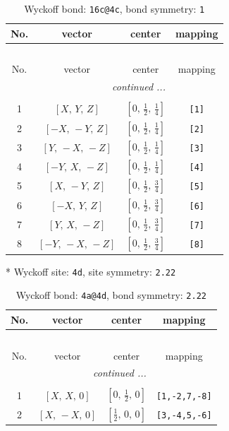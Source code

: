 \documentclass[fleqn,8pt]{jsarticle}
\begin{document}
\begin{longtable}{cccc}
\caption{Wyckoff bond: {\tt 16c@4c}, bond symmetry: {\tt 1}}
 \\
 \hline \hline
No. & vector & center & mapping \\ \hline \endfirsthead

\multicolumn{3}{l}{\tablename\ \thetable{}} \\
 \hline \hline
No. & vector & center & mapping \\ \hline \endhead

 \hline \hline
\multicolumn{3}{r}{\footnotesize\it continued ...} \\ \endfoot

 \hline \hline
\multicolumn{3}{r}{} \\ \endlastfoot

1 & $\left[ X,\, Y,\, Z \right]$ & $\left[ 0,\, \frac{1}{2},\, \frac{1}{4} \right]$ & {\tt [1]} \\ \hline
2 & $\left[ - X,\, - Y,\, Z \right]$ & $\left[ 0,\, \frac{1}{2},\, \frac{1}{4} \right]$ & {\tt [2]} \\ \hline
3 & $\left[ Y,\, - X,\, - Z \right]$ & $\left[ 0,\, \frac{1}{2},\, \frac{1}{4} \right]$ & {\tt [3]} \\ \hline
4 & $\left[ - Y,\, X,\, - Z \right]$ & $\left[ 0,\, \frac{1}{2},\, \frac{1}{4} \right]$ & {\tt [4]} \\ \hline
5 & $\left[ X,\, - Y,\, Z \right]$ & $\left[ 0,\, \frac{1}{2},\, \frac{3}{4} \right]$ & {\tt [5]} \\ \hline
6 & $\left[ - X,\, Y,\, Z \right]$ & $\left[ 0,\, \frac{1}{2},\, \frac{3}{4} \right]$ & {\tt [6]} \\ \hline
7 & $\left[ Y,\, X,\, - Z \right]$ & $\left[ 0,\, \frac{1}{2},\, \frac{3}{4} \right]$ & {\tt [7]} \\ \hline
8 & $\left[ - Y,\, - X,\, - Z \right]$ & $\left[ 0,\, \frac{1}{2},\, \frac{3}{4} \right]$ & {\tt [8]} \\
\end{longtable}
* Wyckoff site: {\tt 4d}, site symmetry: {\tt 2.22}
\renewcommand{\arraystretch}{1.2}
\begin{longtable}{cccc}
\caption{Wyckoff bond: {\tt 4a@4d}, bond symmetry: {\tt 2.22}}
 \\
 \hline \hline
No. & vector & center & mapping \\ \hline \endfirsthead

\multicolumn{3}{l}{\tablename\ \thetable{}} \\
 \hline \hline
No. & vector & center & mapping \\ \hline \endhead

 \hline \hline
\multicolumn{3}{r}{\footnotesize\it continued ...} \\ \endfoot

 \hline \hline
\multicolumn{3}{r}{} \\ \endlastfoot

1 & $\left[ X,\, X,\, 0 \right]$ & $\left[ 0,\, \frac{1}{2},\, 0 \right]$ & {\tt [1,-2,7,-8]} \\ \hline
2 & $\left[ X,\, - X,\, 0 \right]$ & $\left[ \frac{1}{2},\, 0,\, 0 \right]$ & {\tt [3,-4,5,-6]} \\
\end{longtable}
\end{document}
